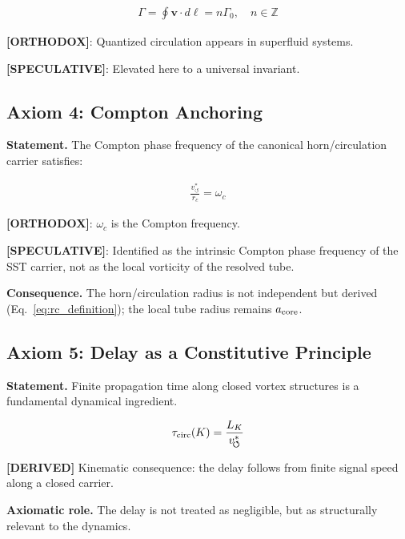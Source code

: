 \documentclass[11pt]{article}
\theoremstyle{definition}
\theoremstyle{plain}
\theoremstyle{remark}
\newcommand{\rc}{{r_c}}
\newcommand{\vchar}{v_{\!\boldsymbol{\circlearrowleft}}^{\ast}}
\begin{document}
        \begin{align}
            \Gamma = \oint \mathbf{v} \cdot d\ell = n \Gamma_0, \quad n \in \mathbb{Z}
        \end{align}
        
        \textbf{[ORTHODOX]}: Quantized circulation appears in superfluid systems.
        
        \textbf{[SPECULATIVE]}: Elevated here to a universal invariant.
    
    \subsection{Axiom 4: Compton Anchoring}
        
        \textbf{Statement.}
        The Compton phase frequency of the canonical horn/circulation carrier satisfies:
        
        \begin{align}
            \frac{\vchar}{\rc} = \omega_c
        \end{align}
        
        \textbf{[ORTHODOX]}: $\omega_c$ is the Compton frequency.
        
        \textbf{[SPECULATIVE]}: Identified as the intrinsic Compton phase frequency of the SST carrier, not as the local vorticity of the resolved tube.
        
        \textbf{Consequence.}
        The horn/circulation radius is not independent but derived (Eq.~\ref{eq:rc_definition}); the local tube radius remains $a_{\rm core}$.
    
    \subsection{Axiom 5: Delay as a Constitutive Principle}
        
        \textbf{Statement.}
        Finite propagation time along closed vortex structures is a fundamental dynamical ingredient.
        
        \begin{align}
            \tau_{\rm circ}(K) = \frac{L_K}{\vchar}
        \end{align}
        
        \textbf{[DERIVED]} Kinematic consequence: the delay follows from finite signal speed along a closed carrier.

        \textbf{Axiomatic role.} The delay is not treated as negligible, but as structurally relevant to the dynamics.
        
\end{document}
